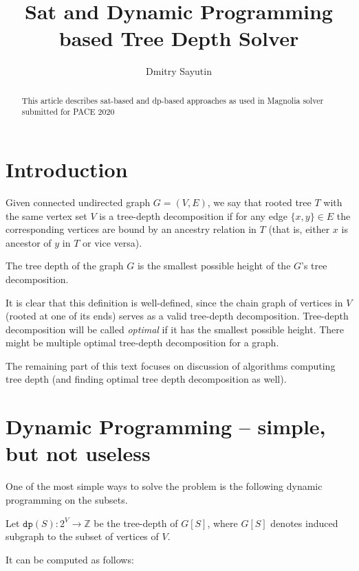 \documentclass[a4paper,UKenglish,cleveref, autoref, thm-restate]{lipics-v2019}
\title{Sat and Dynamic Programming based Tree Depth Solver}
\author{Dmitry Sayutin}{ITMO University, Russia, St. Petersburg \and Higher School of Economics, St. Petersburg campus, Russia \and \url{cdkrot.me}}
{%
}{%
}{}
\begin{document}
\maketitle

\begin{abstract}
This article describes sat-based and dp-based approaches as used in Magnolia solver submitted for PACE 2020
\end{abstract}

\section{Introduction}

\begin{definition}
  Given connected undirected graph $G = (V, E)$, we say that rooted tree $T$ with the same vertex set $V$ is a tree-depth decomposition
  if for any edge $\{x, y\} \in E$ the corresponding vertices are bound by an ancestry relation in $T$ (that is, either $x$ is ancestor
  of $y$ in $T$ or vice versa).
\end{definition}

\begin{definition}
  The tree depth of the graph $G$ is the smallest possible height of the $G$'s tree decomposition.
\end{definition}

It is clear that this definition is well-defined, since the chain graph of vertices in $V$ (rooted at one of its ends) serves as a valid
tree-depth decomposition. Tree-depth decomposition will be called \textit{optimal} if it has the smallest possible height. There might be multiple
optimal tree-depth decomposition for a graph.

The remaining part of this text focuses on discussion of algorithms computing tree depth (and finding optimal tree depth decomposition as well).

\section{Dynamic Programming -- simple, but not useless}

One of the most simple ways to solve the problem is the following dynamic programming on the subsets.

Let $\texttt{dp}(S) \colon 2^V \to \mathbb{Z}$ be the tree-depth of $G[S]$, where $G[S]$ denotes
induced subgraph to the subset of vertices of $V$.

It can be computed as follows:
\end{document}
